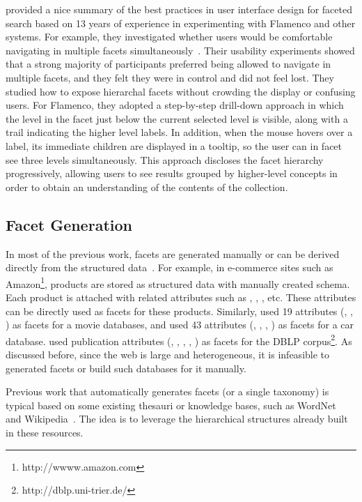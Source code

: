 \citet{hearst2006design} provided a nice summary of the best practices in user interface design for faceted search based on 13 years of experience in experimenting with Flamenco and other systems. For example, they investigated whether users would be comfortable navigating in multiple facets simultaneously~\cite{english2002hierarchical}. Their usability experiments showed that a strong majority of participants preferred being allowed to navigate in multiple facets, and they felt they were in control and did not feel lost. They studied how to expose hierarchal facets without crowding the display or confusing users. For Flamenco, they adopted a step-by-step drill-down approach in which the level in the facet just below the current selected level is visible, along with a trail indicating the higher level labels. In addition, when the mouse hovers over a label, its immediate children are displayed in a tooltip, so the user can in facet see three levels simultaneously. This approach discloses the facet hierarchy 
progressively, allowing users to see results grouped by higher-level concepts in order to obtain an understanding of the contents of the collection.


\subsection{Facet Generation}
In most of the previous work, facets are generated manually or can be derived directly from the structured data~\cite{basu2008minimum,yee2003faceted,dash2008dynamic,ben2008beyond}. For example, in e-commerce sites such as Amazon\footnote{http://wwww.amazon.com}, products are stored as structured data with manually created schema. Each product is attached with related attributes such as , , , etc. These attributes can be directly used as facets for these products. Similarly, \citet{basu2008minimum} used 19 attributes (\eg, , ) as facets for a movie databases, and used 43 attributes (\eg, , , ) as facets for a car database. \citet{dash2008dynamic} used publication attributes (\eg, , , , ) as facets for the DBLP corpus\footnote{http://dblp.uni-trier.de/}. As discussed before, since the web is large and heterogeneous, it is 
infeasible to generated facets or build such databases for it manually.

Previous work that automatically generates facets (or a single taxonomy) is typical based on some existing thesauri or knowledge bases, such as WordNet~\cite{stoica2007automating,dakka2005automatic,dakka2008automatic,latha2010afgf} and Wikipedia~\cite{dakka2008automatic,li2010facetedpedia,kohlschutter2006using}. The idea is to leverage the hierarchical structures already built in these resources.

